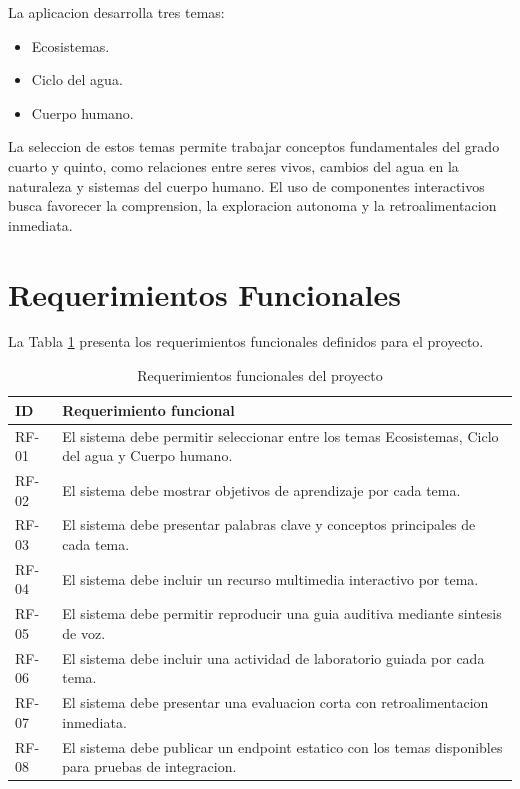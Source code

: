 \documentclass[man,12pt]{apa7}
\begin{document}
La aplicacion desarrolla tres temas:

\begin{itemize}
  \item Ecosistemas.
  \item Ciclo del agua.
  \item Cuerpo humano.
\end{itemize}

La seleccion de estos temas permite trabajar conceptos fundamentales del grado cuarto y quinto, como relaciones entre seres vivos, cambios del agua en la naturaleza y sistemas del cuerpo humano. El uso de componentes interactivos busca favorecer la comprension, la exploracion autonoma y la retroalimentacion inmediata.

\section{Requerimientos Funcionales}

La Tabla \ref{tab:requerimientos} presenta los requerimientos funcionales definidos para el proyecto.

\begin{table}[H]
\centering
\caption{Requerimientos funcionales del proyecto}
\label{tab:requerimientos}
\begin{tabular}{p{2.2cm}p{10.2cm}}
\toprule
\textbf{ID} & \textbf{Requerimiento funcional} \\
\midrule
RF-01 & El sistema debe permitir seleccionar entre los temas Ecosistemas, Ciclo del agua y Cuerpo humano. \\
RF-02 & El sistema debe mostrar objetivos de aprendizaje por cada tema. \\
RF-03 & El sistema debe presentar palabras clave y conceptos principales de cada tema. \\
RF-04 & El sistema debe incluir un recurso multimedia interactivo por tema. \\
RF-05 & El sistema debe permitir reproducir una guia auditiva mediante sintesis de voz. \\
RF-06 & El sistema debe incluir una actividad de laboratorio guiada por cada tema. \\
RF-07 & El sistema debe presentar una evaluacion corta con retroalimentacion inmediata. \\
RF-08 & El sistema debe publicar un endpoint estatico con los temas disponibles para pruebas de integracion. \\
\bottomrule
\end{tabular}
\end{table}
\end{document}
